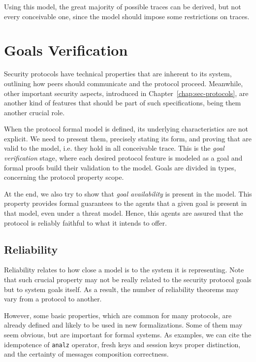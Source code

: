 Using this model, the great majority of possible traces can be derived, but not every conceivable one, since the model should impose some restrictions on traces.





\section{Goals Verification}
Security protocols have technical properties that are inherent to its system, outlining how peers should communicate and the protocol proceed. Meanwhile, other important security aspects, introduced in Chapter~\ref{chap:sec-protocols}, are another kind of features that should be part of such specifications, being them another crucial role.

When the protocol formal model is defined, its underlying characteristics are not explicit. We need to present them, precisely stating its form, and proving that are valid to the model, i.e. they hold in all conceivable trace. This is the \textit{goal verification} stage, where each desired protocol feature is modeled as a goal and formal proofs build their validation to the model. Goals are divided in types, concerning the protocol property scope.

At the end, we also try to show that \textit{goal availability} is present in the model. This property provides formal guarantees to the agents that a given goal is present in that model, even under a threat model. Hence, this agents are assured that the protocol is reliably faithful to what it intends to offer.



\subsection{Reliability}
Reliability relates to how close a model is to the system it is representing. Note that such crucial property may not be really related to the security protocol goals but to system goals itself. As a result, the number of reliability theorems may vary from a protocol to another.

However, some basic properties, which are common for many protocols, are already defined and likely to be used in new formalizations. Some of them may seem obvious, but are important for formal systems. As examples, we can cite the idempotence of \texttt{analz} operator, fresh keys and session keys proper distinction, and the certainty of messages composition correctness.

